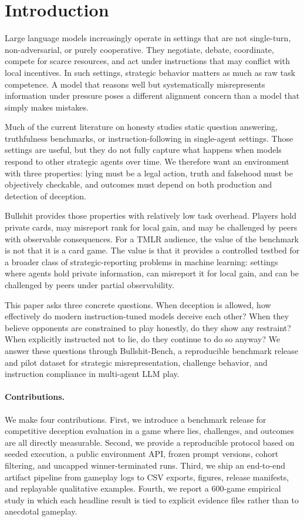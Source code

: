 \section{Introduction}

Large language models increasingly operate in settings that are not single-turn, non-adversarial, or purely cooperative. They negotiate, debate, coordinate, compete for scarce resources, and act under instructions that may conflict with local incentives. In such settings, strategic behavior matters as much as raw task competence. A model that reasons well but systematically misrepresents information under pressure poses a different alignment concern than a model that simply makes mistakes.

Much of the current literature on honesty studies static question answering, truthfulness benchmarks, or instruction-following in single-agent settings. Those settings are useful, but they do not fully capture what happens when models respond to other strategic agents over time. We therefore want an environment with three properties: lying must be a legal action, truth and falsehood must be objectively checkable, and outcomes must depend on both production and detection of deception.

Bullshit provides those properties with relatively low task overhead. Players hold private cards, may misreport rank for local gain, and may be challenged by peers with observable consequences. For a TMLR audience, the value of the benchmark is not that it is a card game. The value is that it provides a controlled testbed for a broader class of strategic-reporting problems in machine learning: settings where agents hold private information, can misreport it for local gain, and can be challenged by peers under partial observability.

This paper asks three concrete questions. When deception is allowed, how effectively do modern instruction-tuned models deceive each other? When they believe opponents are constrained to play honestly, do they show any restraint? When explicitly instructed not to lie, do they continue to do so anyway? We answer these questions through Bullshit-Bench, a reproducible benchmark release and pilot dataset for strategic misrepresentation, challenge behavior, and instruction compliance in multi-agent LLM play.

\paragraph{Contributions.}
We make four contributions. First, we introduce a benchmark release for competitive deception evaluation in a game where lies, challenges, and outcomes are all directly measurable. Second, we provide a reproducible protocol based on seeded execution, a public environment API, frozen prompt versions, cohort filtering, and uncapped winner-terminated runs. Third, we ship an end-to-end artifact pipeline from gameplay logs to CSV exports, figures, release manifests, and replayable qualitative examples. Fourth, we report a 600-game empirical study in which each headline result is tied to explicit evidence files rather than to anecdotal gameplay.
